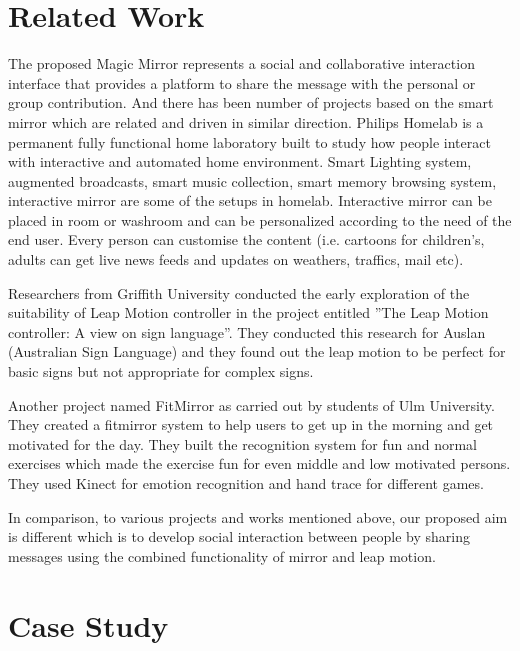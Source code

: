 \documentclass{sigchi-ext}
\begin{document}
\section{Related Work}
The proposed Magic Mirror represents a social and collaborative interaction interface that provides a platform to share the message with the personal or group contribution. And there has been number of projects based on the smart mirror which are related and driven in similar direction. Philips Homelab is a permanent fully functional home laboratory built to study how people interact with interactive and automated home environment. Smart Lighting system, augmented broadcasts, smart music collection, smart memory browsing system, interactive mirror are some of the setups in homelab. Interactive mirror can be placed in room or washroom and can be personalized according to the need of the end user. Every person can customise the content (i.e. cartoons for children's, adults can get live news feeds and updates on weathers, traffics, mail etc).

Researchers from Griffith University conducted the early exploration of the suitability of Leap Motion controller in the project entitled ''The Leap Motion controller: A view on sign language''. They conducted this research for Auslan (Australian Sign Language) and they found out the leap motion to be perfect for basic signs but not appropriate for complex signs.

Another project named FitMirror as carried out by students of Ulm University. They created a fitmirror system to help users to get up in the morning and get motivated for the day. They built the recognition system for fun and normal exercises which made the exercise fun for even middle and low motivated persons. They used Kinect for emotion recognition and hand trace for different games.

In comparison, to various projects and works mentioned above, our proposed aim is different which is to develop social interaction between people by sharing messages using the combined functionality of mirror and leap motion.


\section{Case Study}
\end{document}
